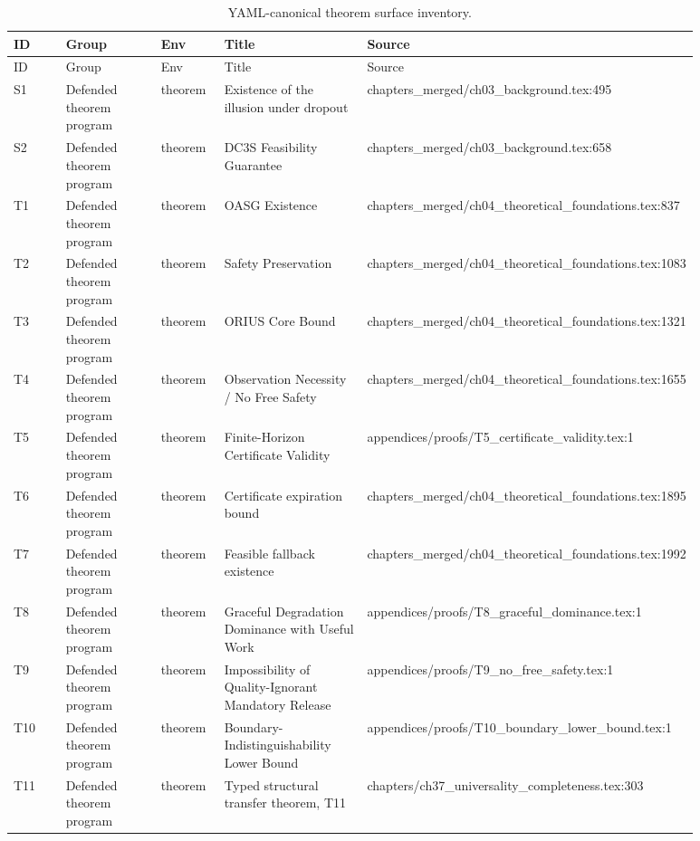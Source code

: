 \begin{longtable}{p{0.10\linewidth}p{0.18\linewidth}p{0.10\linewidth}p{0.24\linewidth}p{0.26\linewidth}}
\caption{YAML-canonical theorem surface inventory.}\\
\toprule
ID & Group & Env & Title & Source \\
\midrule
\endfirsthead
\toprule
ID & Group & Env & Title & Source \\
\midrule
\endhead
S1 & Defended theorem program & theorem & Existence of the illusion under dropout & chapters\_merged/ch03\_background.tex:495 \\
S2 & Defended theorem program & theorem & DC3S Feasibility Guarantee & chapters\_merged/ch03\_background.tex:658 \\
T1 & Defended theorem program & theorem & OASG Existence & chapters\_merged/ch04\_theoretical\_foundations.tex:837 \\
T2 & Defended theorem program & theorem & Safety Preservation & chapters\_merged/ch04\_theoretical\_foundations.tex:1083 \\
T3 & Defended theorem program & theorem & ORIUS Core Bound & chapters\_merged/ch04\_theoretical\_foundations.tex:1321 \\
T4 & Defended theorem program & theorem & Observation Necessity / No Free Safety & chapters\_merged/ch04\_theoretical\_foundations.tex:1655 \\
T5 & Defended theorem program & theorem & Finite-Horizon Certificate Validity & appendices/proofs/T5\_certificate\_validity.tex:1 \\
T6 & Defended theorem program & theorem & Certificate expiration bound & chapters\_merged/ch04\_theoretical\_foundations.tex:1895 \\
T7 & Defended theorem program & theorem & Feasible fallback existence & chapters\_merged/ch04\_theoretical\_foundations.tex:1992 \\
T8 & Defended theorem program & theorem & Graceful Degradation Dominance with Useful Work & appendices/proofs/T8\_graceful\_dominance.tex:1 \\
T9 & Defended theorem program & theorem & Impossibility of Quality-Ignorant Mandatory Release & appendices/proofs/T9\_no\_free\_safety.tex:1 \\
T10 & Defended theorem program & theorem & Boundary-Indistinguishability Lower Bound & appendices/proofs/T10\_boundary\_lower\_bound.tex:1 \\
T11 & Defended theorem program & theorem & Typed structural transfer theorem, T11 & chapters/ch37\_universality\_completeness.tex:303 \\

\end{longtable}
